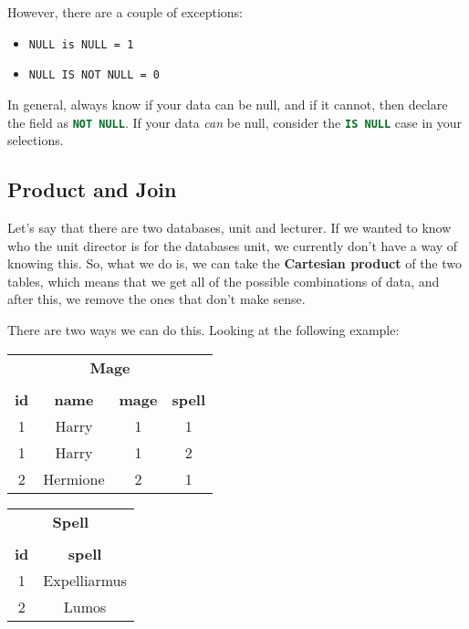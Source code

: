 \documentclass[11pt,a4paper,titlepage,dvipsnames,cmyk]{scrartcl}
\begin{document}
However, there are a couple of exceptions:

\begin{itemize}
    \item \lstinline{NULL is NULL = 1}
        \item \lstinline{NULL IS NOT NULL = 0} 
\end{itemize}

In general, always know if your data can be null, and if it cannot, then
declare the field as \lstinline[language=SQL]{NOT NULL}. If your data
\textit{can} be null, consider the \lstinline[language=SQL]{IS NULL} case
in your selections.

\subsection{Product and Join}%
\label{sub:product-join}

Let's say that there are two databases, unit and lecturer. If we wanted to
know who the unit director is for the databases unit, we currently don't
have a way of knowing this. So, what we do is, we can take the
\textbf{Cartesian product} of the two tables, which means that we get all
of the possible combinations of data, and after this, we remove the ones
that don't make sense.

There are two ways we can do this. Looking at the following example:

\begin{center}
    \begin{tabular}{|c|c|c|c|}
        \multicolumn{4}{c}{\textbf{Mage}} \\
        \multicolumn{4}{c}{} \\
        \hline
        \textbf{id} & \textbf{name} & \textbf{mage} & \textbf{spell} \\
        \hhline{|=|=|=|=|}
        1 & Harry & 1 & 1 \\ \hline
        1 & Harry & 1 & 2 \\ \hline
        2 & Hermione & 2 & 1 \\ \hline
    \end{tabular}
\end{center}

\begin{center}
    \begin{tabular}{|c|c|}
        \multicolumn{2}{c}{\textbf{Spell}} \\
        \multicolumn{2}{c}{} \\
        \hline
        \textbf{id} & \textbf{spell} \\ \hhline{|=|=|}
        1 & Expelliarmus \\ \hline
        2 & Lumos \\ \hline
    \end{tabular}
\end{center}
\end{document}

